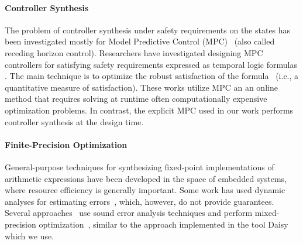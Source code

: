 \paragraph{Controller Synthesis}
The problem of controller synthesis under safety requirements on the states has
been investigated mostly for Model Predictive Control (MPC)~\cite{camacho2013model} (also called receding horizon control).
Researchers have investigated designing MPC controllers for satisfying safety requirements expressed as temporal logic formulas 
\cite{FMPS18,KaramanSF08,raman2014model,WongpiromsarnTM12,pant2017smooth,kim2017dynamic}.
The main technique is to optimize the robust satisfaction of 
the formula~\cite{donze2010robust} (i.e., a quantitative measure of satisfaction).
These works utilize MPC an an online method that requires solving at runtime often computationally 
expensive optimization problems. In contrast, the explicit MPC used in our work performs controller synthesis at the design time.


\paragraph{Finite-Precision Optimization}
General-purpose techniques for synthesizing fixed-point implementations of 
arithmetic expressions have been developed in the space of embedded systems,
where resource efficiency is generally important.
Some work has used dynamic analyses for estimating
errors~\cite{Gaffar2004,Mallik2007}, which, however, do not provide guarantees.
Several approaches~\cite{Lee2006,Osborne2007,Kinsman2009,Pang2011} use sound
error analysis techniques and perform mixed-precision optimization~\cite{Lee2006,Pang2011},
similar to the approach implemented in the tool Daisy which we use. 
